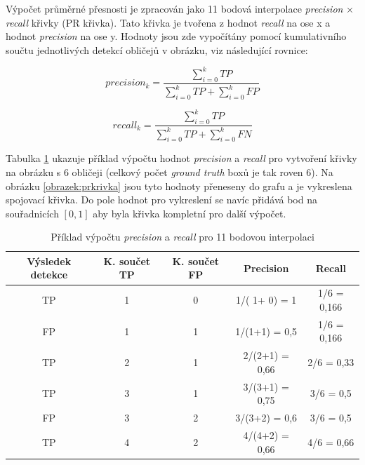 Výpočet průměrné přesnosti je zpracován jako 11 bodová interpolace \cite{interpolace} \emph{precision} $\times$ \emph{recall} křivky (PR křivka). Tato křivka je tvořena z hodnot \emph{recall} na ose x a hodnot \emph{precision} na ose y. Hodnoty jsou zde vypočítány pomocí kumulativního součtu jednotlivých detekcí obličejů v obrázku, viz následující rovnice:

\begin{equation}
  precision_k = \frac{\sum_{i=0}^{k} TP}{\sum_{i=0}^{k} TP + \sum_{i=0}^{k} FP}
\end{equation}

\begin{equation}
  recall_k = \frac{\sum_{i=0}^{k} TP}{\sum_{i=0}^{k} TP + \sum_{i=0}^{k} FN}
\end{equation}

Tabulka \ref{tabulka:prkrivka} ukazuje příklad výpočtu hodnot \emph{precision} a \emph{recall} pro vytvoření křivky na obrázku s 6 obličeji (celkový počet \emph{ground truth} boxů je tak roven 6). Na obrázku \ref{obrazek:prkrivka} jsou tyto hodnoty přeneseny do grafu a je vykreslena spojovací křivka. Do pole hodnot pro vykreslení se navíc přidává bod na souřadnicích $[0, 1]$ aby byla křivka kompletní pro další výpočet.

\begin{table}[H]
  \begin{tabular}{|c|c|c|c|c|}
  \hline
  \rowcolor[HTML]{E0DBDB} 
  \textbf{Výsledek detekce} & \textbf{K. součet TP} & \textbf{K. součet FP} & \textbf{Precision} & \textbf{Recall} \\ \hline
  TP         & {\color[HTML]{3531FF} 1} & {\color[HTML]{FE0000} 0} & {\color[HTML]{3531FF} 1}/({\color[HTML]{3531FF} 1}+{\color[HTML]{FE0000} 0}) = 1 & {\color[HTML]{3531FF} 1}/6 = 0,166     \\ \hline
  FP    & 1   & 1     & 1/(1+1) = 0,5    & 1/6 = 0,166 \\ \hline
  TP   & 2    & 1   & 2/(2+1) = 0,66   & 2/6 = 0,33      \\ \hline
  TP    & 3    & 1   & 3/(3+1) = 0,75     & 3/6 = 0,5       \\ \hline
  FP   & 3     & 2     & 3/(3+2) = 0,6     & 3/6 = 0,5       \\ \hline
  TP  & 4    & 2   & 4/(4+2) = 0,66  & 4/6 = 0,66    \\ \hline
  \end{tabular}
  \label{tabulka:prkrivka}
  \caption{Příklad výpočtu \emph{precision} a \emph{recall} pro 11 bodovou interpolaci}
\end{table}

